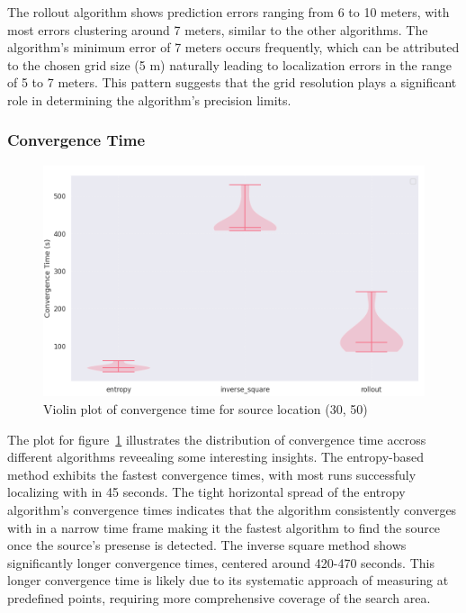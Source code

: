\documentclass[../report.tex]{subfiles}
\begin{document}
    The rollout algorithm shows prediction errors ranging from 6 to 10 meters, with most errors clustering around 7 meters, similar to the other algorithms. The algorithm's minimum error of 7 
    meters occurs frequently, which can be attributed to the chosen grid size (5 m) naturally leading to localization errors in the range of 5 to 7 meters. This pattern suggests that the grid 
    resolution plays a significant role in determining the algorithm's precision limits.
    
    \vspace{0.3cm}

    \subsubsection{Convergence Time}

    \begin{figure}[ht]
        \centering
        \includegraphics[width=\linewidth]{figures/convergence_violin_plot.png}
        \caption{Violin plot of convergence time for source location (30, 50)}
        \label{fig:convergence_violin_plot}
    \end{figure}

    The plot for figure~\ref{fig:convergence_violin_plot} illustrates the distribution of convergence time accross different algorithms reveealing some interesting insights. The entropy-based 
    method exhibits the fastest convergence times, with most runs successfuly localizing with in 45 seconds. The tight horizontal spread of the entropy algorithm's convergence times indicates
    that the algorithm consistently converges with in a narrow time frame making it the fastest algorithm to find the source once the source's presense is detected. The inverse square method 
    shows significantly longer convergence times, centered around 420-470 seconds.  This longer convergence time is likely due to its systematic approach of measuring at predefined points, requiring
    more comprehensive coverage of the search area.
\end{document}
